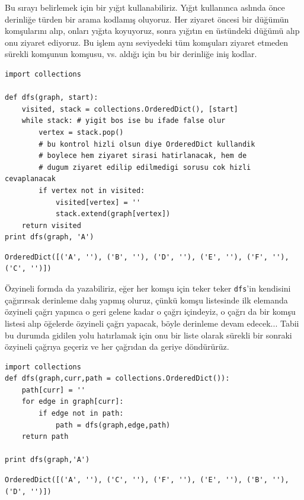 \documentclass[12pt,fleqn]{article}\usepackage{../../common}
\begin{document}
Bu sırayı belirlemek için bir yığıt kullanabiliriz. Yığıt kullanınca
aslında önce derinliğe türden bir arama kodlamış oluyoruz. Her ziyaret
öncesi bir düğümün komşularını alıp, onları yığıta koyuyoruz, sonra yığıtın
en üstündeki düğümü alıp onu ziyaret ediyoruz. Bu işlem aynı seviyedeki tüm
komşuları ziyaret etmeden sürekli komşunun komşusu, vs. aldığı için bu bir
derinliğe iniş kodlar. 

\begin{verbatim}
import collections

def dfs(graph, start):
    visited, stack = collections.OrderedDict(), [start]
    while stack: # yigit bos ise bu ifade false olur
        vertex = stack.pop()
        # bu kontrol hizli olsun diye OrderedDict kullandik
        # boylece hem ziyaret sirasi hatirlanacak, hem de
        # dugum ziyaret edilip edilmedigi sorusu cok hizli cevaplanacak
        if vertex not in visited:
            visited[vertex] = ''
            stack.extend(graph[vertex])
    return visited
print dfs(graph, 'A')
\end{verbatim}

\begin{verbatim}
OrderedDict([('A', ''), ('B', ''), ('D', ''), ('E', ''), ('F', ''), ('C', '')])
\end{verbatim}

Özyineli formda da yazabiliriz, eğer her komşu için teker teker
\verb!dfs!'in kendisini çağırırsak derinleme dalış yapmış oluruz, çünkü
komşu listesinde ilk elemanda özyineli çağrı yapınca o geri gelene kadar o
çağrı içindeyiz, o çağrı da bir komşu listesi alıp öğelerde özyineli çağrı
yapacak, böyle derinleme devam edecek... Tabii bu durumda gidilen yolu
hatırlamak için onu bir liste olarak sürekli bir sonraki özyineli çağrıya
geçeriz ve her çağrıdan da geriye döndürürüz.

\begin{verbatim}
import collections
def dfs(graph,curr,path = collections.OrderedDict()):
    path[curr] = ''
    for edge in graph[curr]:
        if edge not in path:
            path = dfs(graph,edge,path)
    return path

print dfs(graph,'A')
\end{verbatim}

\begin{verbatim}
OrderedDict([('A', ''), ('C', ''), ('F', ''), ('E', ''), ('B', ''), ('D', '')])
\end{verbatim}
\end{document}
